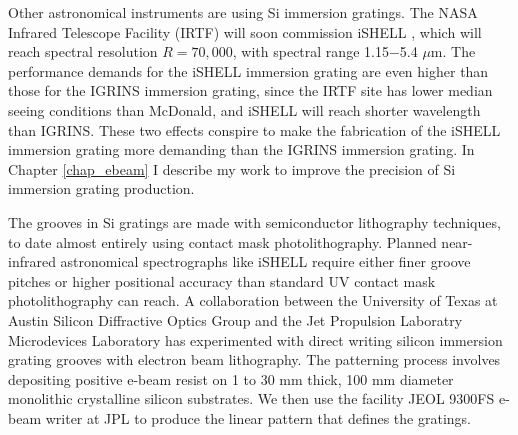 Other astronomical instruments are using Si immersion gratings.  The NASA Infrared Telescope Facility (IRTF) will soon commission iSHELL \citep{2012SPIE.8446E..2CR}, which will reach spectral resolution $R=70,000$, with spectral range 1.15$-$5.4 $\mu$m.  The performance demands for the iSHELL immersion grating are even higher than those for the IGRINS immersion grating, since the IRTF site has lower median seeing conditions than McDonald, and iSHELL will reach shorter wavelength than IGRINS.  These two effects conspire to make the fabrication of the iSHELL immersion grating more demanding than the IGRINS immersion grating.  In Chapter \ref{chap_ebeam} I describe my work to improve the precision of Si immersion grating production.

The grooves in Si gratings are made with semiconductor lithography techniques, to date almost entirely using contact mask photolithography.  Planned near-infrared astronomical spectrographs like iSHELL require either finer groove pitches or higher positional accuracy than standard UV contact mask photolithography can reach.  A collaboration between the University of Texas at Austin Silicon Diffractive Optics Group and the Jet Propulsion Laboratry Microdevices Laboratory has experimented with direct writing silicon immersion grating grooves with electron beam lithography.  The patterning process involves depositing positive e-beam resist on 1 to 30 mm thick, 100 mm diameter monolithic crystalline silicon substrates.  We then use the facility JEOL 9300FS e-beam writer at JPL to produce the linear pattern that defines the gratings.

